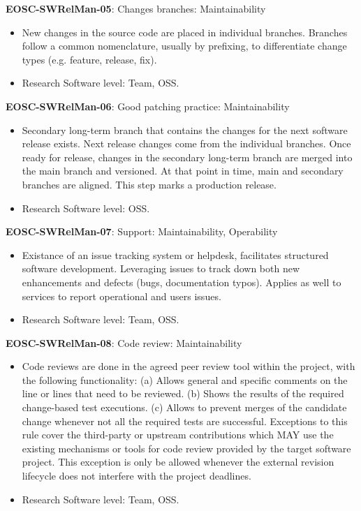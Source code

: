 \textbf{EOSC-SWRelMan-05}: Changes branches: Maintainability

\begin{itemize}
    \item New changes in the source code are placed in individual branches. Branches follow a common nomenclature, usually by prefixing, to differentiate change types (e.g. feature, release, fix). \cite{orviz_set_2017}
    \item Research Software level: Team, OSS.
\end{itemize}

\textbf{EOSC-SWRelMan-06}: Good patching practice: Maintainability

\begin{itemize}
    \item Secondary long-term branch that contains the changes for the next software release exists. Next release changes come from the individual branches. Once ready for release, changes in the secondary long-term branch are merged into the main branch and versioned. At that point in time, main and secondary branches are aligned. This step marks a production release. \cite{orviz_set_2017,raymond_software_2013}
    \item Research Software level: OSS.
\end{itemize}

\textbf{EOSC-SWRelMan-07}: Support: Maintainability, Operability

\begin{itemize}
    \item Existance of an issue tracking system or helpdesk, facilitates structured software development. Leveraging issues to track down both new enhancements and defects (bugs, documentation typos). Applies as well to services to report operational and users issues. \cite{srisopha_software_2018,shepherdson_cessda_2019,orviz_set_2017,orviz_fernandez_eosc-synergy_2020}
    \item Research Software level: Team, OSS.
\end{itemize}

\textbf{EOSC-SWRelMan-08}: Code review: Maintainability

\begin{itemize}
    \item Code reviews are done in the agreed peer review tool within the project, with the following  functionality: (a) Allows general and specific comments on the line or lines that need to be reviewed. (b) Shows the results of the required change-based test executions. (c) Allows to prevent merges of the candidate change whenever not all the required tests are successful. Exceptions to this rule cover the third-party or upstream contributions which MAY use the existing mechanisms or tools for code review provided by the target software project. This exception is only be allowed whenever the external revision lifecycle does not interfere with the project deadlines. \cite{srisopha_software_2018,aberdour_achieving_2007,zuser_software_2005,orviz_set_2017}
    \item Research Software level: Team, OSS.
\end{itemize}


